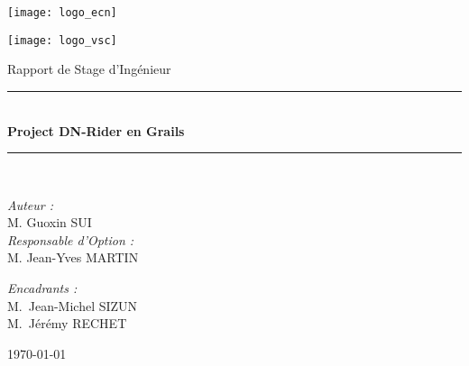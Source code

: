 \begin{titlepage}

\noindent
\begin{minipage}{0.3\textwidth}
  \begin{flushleft} \large
    \texttt{[image: logo\_ecn]}\\[1cm]
  \end{flushleft}
\end{minipage}%
\hfill
\begin{minipage}{0.3\textwidth}
  \begin{flushright} \large
    \texttt{[image: logo\_vsc]}\\[1cm]
  \end{flushright}
\end{minipage}

\begin{center}
\vskip 2cm

{\large Rapport de Stage d'Ingénieur}\\[0.5cm]

\rule{\linewidth}{0.5mm} \\[0.4cm]
{ \huge \bfseries Project DN-Rider en Grails \\[0.4cm] }
\rule{\linewidth}{0.5mm} \\[1.5cm]

\noindent
\begin{minipage}{0.4\textwidth}
  \begin{flushleft} \large
    \emph{Auteur :}\\
    M. Guoxin \textsc{SUI}\\
    \bigbreak
    \emph{Responsable d'Option :}\\
    M. Jean-Yves \textsc{MARTIN}\\
  \end{flushleft}
\end{minipage}%
\hfill
\begin{minipage}{0.4\textwidth}
  \begin{flushright} \large
    \emph{Encadrants :} \\
    M.~Jean-Michel \textsc{SIZUN}\\
    M.~Jérémy \textsc{RECHET}
  \end{flushright}
\end{minipage}

\vfill

{\large \today}

\end{center}
\end{titlepage}
